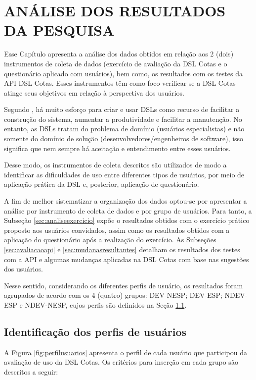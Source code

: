 \chapter{ANÁLISE DOS RESULTADOS DA  PESQUISA}
\label{chap:analise}

Esse Capítulo apresenta a análise dos dados obtidos em relação aos 2 (dois) instrumentos de coleta de dados (exercício de avaliação da DSL Cotas e o questionário aplicado com usuários), bem como, os resultados com os testes da API DSL Cotas. Esses instrumentos têm como foco verificar se a DSL Cotas atinge seus objetivos em relação à perspectiva dos usuários. 


Segundo , há muito esforço para criar e usar \gls{DSL}s como recurso de facilitar a construção do sistema, aumentar a produtividade e facilitar a manutenção. No entanto, as \gls{DSL}s tratam do problema de domínio (usuários especialistas) e não somente do domínio de solução (desenvolvedores/engenheiros de software), isso significa que nem sempre há aceitação e entendimento entre esses usuários.

Desse modo, os instrumentos de coleta descritos são utilizados de modo a identificar as dificuldades de uso entre diferentes tipos de usuários, por meio de aplicação prática da DSL e, posterior, aplicação de questionário. 

A fim de melhor sistematizar a organização dos dados optou-se por apresentar a análise por instrumento de coleta de dados e por grupo de usuários. Para tanto, a Subseção \ref{sec:analiseexercicio} expõe o resultados obtidos com o exercício prático proposto aos usuários convidados, assim como os resultados obtidos com a aplicação do questionário após a realização do exercício. As Subseções \ref{sec:avaliacaoapi} e \ref{sec:mudanasresultantes} detalham os resultados dos testes com a API e algumas mudanças aplicadas na DSL Cotas com base nas sugestões dos usuários.


Nesse sentido, considerando os diferentes perfis de usuário, os resultados foram agrupados de acordo com os 4 (quatro) grupos:  DEV-NESP; DEV-ESP; NDEV-ESP e NDEV-NESP, cujos perfis são definidos na Seção \ref{sec:idperfis}.


\section{Identificação dos perfis de usuários}
\label{sec:idperfis}


A Figura \ref{fig:perfilusuarios} apresenta o perfil de cada usuário que participou da avaliação de uso da DSL Cotas. Os critérios para inserção em cada grupo são descritos a seguir:

